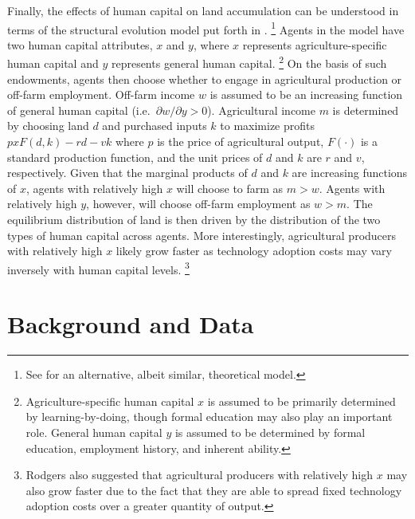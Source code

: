 \documentclass[english]{article}
\begin{document}
Finally, the effects of human capital on land accumulation can be understood
in terms of the structural evolution model put forth in \citet{rodgers1994}.%
\footnote{See \citet{sumner1987} for an alternative, albeit similar, theoretical
model.}
Agents in the model have two human capital attributes, $x$ and $y$, where
$x$ represents agriculture-specific human capital and $y$ represents general 
human capital.%
\footnote{Agriculture-specific human capital $x$ is assumed to be primarily 
determined by learning-by-doing, though formal education may also play an 
important role. 
General human capital $y$ is assumed to be determined by formal education, 
employment history, and inherent ability.}
On the basis of such endowments, agents then choose whether to engage in 
agricultural production or off-farm employment.
Off-farm income $w$ is assumed to be an increasing function of general
human capital (i.e.\ $\partial w/ \partial y > 0$). 
Agricultural income $m$ is determined by choosing land $d$ and purchased 
inputs $k$ to maximize profits $p x F(d,k) - rd - vk$ where $p$ is the price 
of agricultural output, $F(\cdot)$ is a standard production function, 
and the unit prices of $d$ and $k$ are $r$ and $v$, respectively.
Given that the marginal products of $d$ and $k$ are increasing functions of 
$x$, agents with relatively high $x$ will choose to farm as $m > w$.
Agents with relatively high $y$, however, will choose off-farm employment
 as $w > m$.
The equilibrium distribution of land is then driven by the distribution of the 
two types of human capital across agents.
More interestingly, agricultural producers with relatively high $x$ likely 
grow faster as technology adoption costs may vary inversely with human 
capital levels.%
\footnote{Rodgers also suggested that agricultural producers with relatively 
high $x$ may also grow faster due to the fact that they are able to spread fixed 
technology adoption costs over a greater quantity of output.}


\section{Background and Data}
\label{sec: data}
\end{document}
